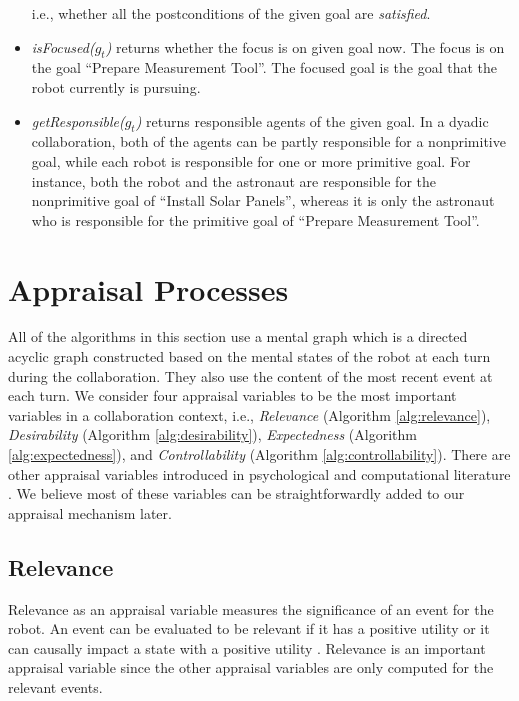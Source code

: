 \documentclass{aamas2016}
\begin{document}
\begin{itemize}
  i.e., whether all the postconditions of the given goal are \textit{satisfied}.
  \item \textit{isFocused($g_t$)} returns whether the focus is on given
  goal now. The focus is on the goal ``Prepare Measurement Tool''. The focused
  goal is the goal that the robot currently is pursuing.
  \item \textit{getResponsible($g_t$)} returns responsible agents of the
  given goal. In a dyadic collaboration, both of the agents can be partly
  responsible for a nonprimitive goal, while each robot is responsible for one
  or more primitive goal. For instance, both the robot and the astronaut are
  responsible for the nonprimitive goal of ``Install Solar Panels'', whereas
  it is only the astronaut who is responsible for the primitive goal of
  ``Prepare Measurement Tool''.
\end{itemize}

\section{Appraisal Processes}
\label{sec:appraisal-process}

All of the algorithms in this section use a mental graph which is a directed
acyclic graph constructed based on the mental states of the robot at each turn
during the collaboration. They also use the content of the most recent event at
each turn. We consider four appraisal variables to be the most important
variables in a collaboration context, i.e., \textit{Relevance} (Algorithm
\ref{alg:relevance}), \textit{Desirability} (Algorithm \ref{alg:desirability}),
\textit{Expectedness} (Algorithm \ref{alg:expectedness}), and
\textit{Controllability} (Algorithm \ref{alg:controllability}). There are other
appraisal variables introduced in psychological
\cite{scherer:appraisal-processes} and computational literature
\cite{gratch:domain-independent}. We believe most of these variables can be
straightforwardly added to our appraisal mechanism later.

\subsection{Relevance}

Relevance as an appraisal variable measures the significance of an event for the
robot. An event can be evaluated to be relevant if it has a positive utility or
it can causally impact a state with a positive utility
\cite{marsella:ema-process-model}. Relevance is an important appraisal variable
since the other appraisal variables are only computed for the relevant events.
\end{document}
